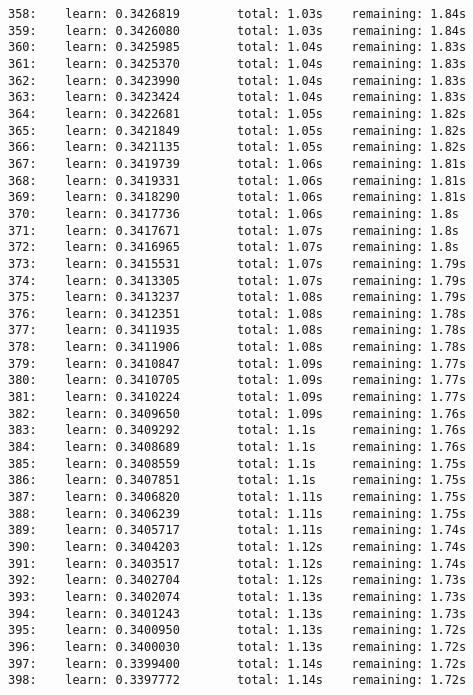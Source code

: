 \documentclass[11pt]{article}
\begin{document}
\begin{Verbatim}[commandchars=\\\{\}]
358:    learn: 0.3426819        total: 1.03s    remaining: 1.84s
359:    learn: 0.3426080        total: 1.03s    remaining: 1.84s
360:    learn: 0.3425985        total: 1.04s    remaining: 1.83s
361:    learn: 0.3425370        total: 1.04s    remaining: 1.83s
362:    learn: 0.3423990        total: 1.04s    remaining: 1.83s
363:    learn: 0.3423424        total: 1.04s    remaining: 1.83s
364:    learn: 0.3422681        total: 1.05s    remaining: 1.82s
365:    learn: 0.3421849        total: 1.05s    remaining: 1.82s
366:    learn: 0.3421135        total: 1.05s    remaining: 1.82s
367:    learn: 0.3419739        total: 1.06s    remaining: 1.81s
368:    learn: 0.3419331        total: 1.06s    remaining: 1.81s
369:    learn: 0.3418290        total: 1.06s    remaining: 1.81s
370:    learn: 0.3417736        total: 1.06s    remaining: 1.8s
371:    learn: 0.3417671        total: 1.07s    remaining: 1.8s
372:    learn: 0.3416965        total: 1.07s    remaining: 1.8s
373:    learn: 0.3415531        total: 1.07s    remaining: 1.79s
374:    learn: 0.3413305        total: 1.07s    remaining: 1.79s
375:    learn: 0.3413237        total: 1.08s    remaining: 1.79s
376:    learn: 0.3412351        total: 1.08s    remaining: 1.78s
377:    learn: 0.3411935        total: 1.08s    remaining: 1.78s
378:    learn: 0.3411906        total: 1.08s    remaining: 1.78s
379:    learn: 0.3410847        total: 1.09s    remaining: 1.77s
380:    learn: 0.3410705        total: 1.09s    remaining: 1.77s
381:    learn: 0.3410224        total: 1.09s    remaining: 1.77s
382:    learn: 0.3409650        total: 1.09s    remaining: 1.76s
383:    learn: 0.3409292        total: 1.1s     remaining: 1.76s
384:    learn: 0.3408689        total: 1.1s     remaining: 1.76s
385:    learn: 0.3408559        total: 1.1s     remaining: 1.75s
386:    learn: 0.3407851        total: 1.1s     remaining: 1.75s
387:    learn: 0.3406820        total: 1.11s    remaining: 1.75s
388:    learn: 0.3406239        total: 1.11s    remaining: 1.75s
389:    learn: 0.3405717        total: 1.11s    remaining: 1.74s
390:    learn: 0.3404203        total: 1.12s    remaining: 1.74s
391:    learn: 0.3403517        total: 1.12s    remaining: 1.74s
392:    learn: 0.3402704        total: 1.12s    remaining: 1.73s
393:    learn: 0.3402074        total: 1.13s    remaining: 1.73s
394:    learn: 0.3401243        total: 1.13s    remaining: 1.73s
395:    learn: 0.3400950        total: 1.13s    remaining: 1.72s
396:    learn: 0.3400030        total: 1.13s    remaining: 1.72s
397:    learn: 0.3399400        total: 1.14s    remaining: 1.72s
398:    learn: 0.3397772        total: 1.14s    remaining: 1.72s

\end{Verbatim}
\end{document}
